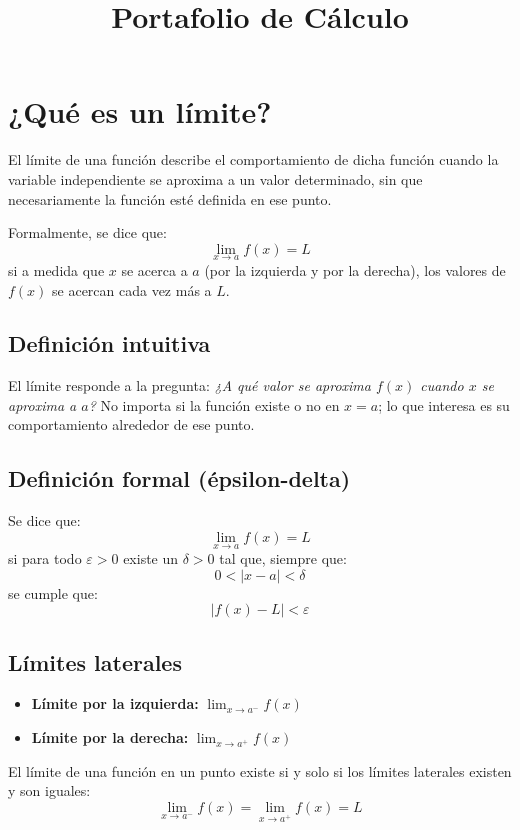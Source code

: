 \documentclass[12pt]{article}
\title{Portafolio de Cálculo}
\author{}
\date{}
\begin{document}
\maketitle


\section{¿Qué es un límite?}

El límite de una función describe el comportamiento de dicha función cuando la variable independiente se aproxima a un valor determinado, sin que necesariamente la función esté definida en ese punto.

Formalmente, se dice que:
\[
\lim_{x \to a} f(x) = L
\]
si a medida que $x$ se acerca a $a$ (por la izquierda y por la derecha), los valores de $f(x)$ se acercan cada vez más a $L$.

\subsection{Definición intuitiva}

El límite responde a la pregunta: \textit{¿A qué valor se aproxima $f(x)$ cuando $x$ se aproxima a $a$?} No importa si la función existe o no en $x = a$; lo que interesa es su comportamiento alrededor de ese punto.

\subsection{Definición formal (épsilon-delta)}

Se dice que:
\[
\lim_{x \to a} f(x) = L
\]
si para todo $\varepsilon > 0$ existe un $\delta > 0$ tal que, siempre que:
\[
0 < |x - a| < \delta
\]
se cumple que:
\[
|f(x) - L| < \varepsilon
\]

\subsection{Límites laterales}

\begin{itemize}
    \item \textbf{Límite por la izquierda:} $\displaystyle \lim_{x \to a^-} f(x)$
    \item \textbf{Límite por la derecha:} $\displaystyle \lim_{x \to a^+} f(x)$
\end{itemize}

El límite de una función en un punto existe si y solo si los límites laterales existen y son iguales:
\[
\lim_{x \to a^-} f(x) = \lim_{x \to a^+} f(x) = L
\]
\end{document}
